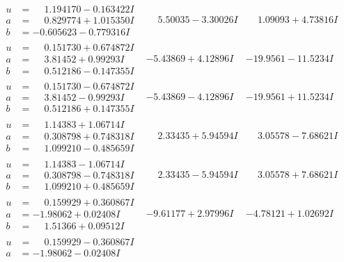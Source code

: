 \documentclass[1p]{elsarticle_modified}
\theoremstyle{definition}
\begin{document}
$$\begin{array}{c|c|c}
\begin{aligned}
u &= \phantom{-}1.194170 - 0.163422 I \\
a &= \phantom{-}0.829774 + 1.015350 I \\
b &= -0.605623 - 0.779316 I\end{aligned}
 & \phantom{-}5.50035 - 3.30026 I & \phantom{-}1.09093 + 4.73816 I \\ \hline\begin{aligned}
u &= \phantom{-}0.151730 + 0.674872 I \\
a &= \phantom{-}3.81452 + 0.99293 I \\
b &= \phantom{-}0.512186 - 0.147355 I\end{aligned}
 & -5.43869 + 4.12896 I & -19.9561 - 11.5234 I \\ \hline\begin{aligned}
u &= \phantom{-}0.151730 - 0.674872 I \\
a &= \phantom{-}3.81452 - 0.99293 I \\
b &= \phantom{-}0.512186 + 0.147355 I\end{aligned}
 & -5.43869 - 4.12896 I & -19.9561 + 11.5234 I \\ \hline\begin{aligned}
u &= \phantom{-}1.14383 + 1.06714 I \\
a &= \phantom{-}0.308798 + 0.748318 I \\
b &= \phantom{-}1.099210 - 0.485659 I\end{aligned}
 & \phantom{-}2.33435 + 5.94594 I & \phantom{-}3.05578 - 7.68621 I \\ \hline\begin{aligned}
u &= \phantom{-}1.14383 - 1.06714 I \\
a &= \phantom{-}0.308798 - 0.748318 I \\
b &= \phantom{-}1.099210 + 0.485659 I\end{aligned}
 & \phantom{-}2.33435 - 5.94594 I & \phantom{-}3.05578 + 7.68621 I \\ \hline\begin{aligned}
u &= \phantom{-}0.159929 + 0.360867 I \\
a &= -1.98062 + 0.02408 I \\
b &= \phantom{-}1.51366 + 0.09512 I\end{aligned}
 & -9.61177 + 2.97996 I & -4.78121 + 1.02692 I \\ \hline\begin{aligned}
u &= \phantom{-}0.159929 - 0.360867 I \\
a &= -1.98062 - 0.02408 I \\

\end{aligned}
\end{array}$$
\end{document}
